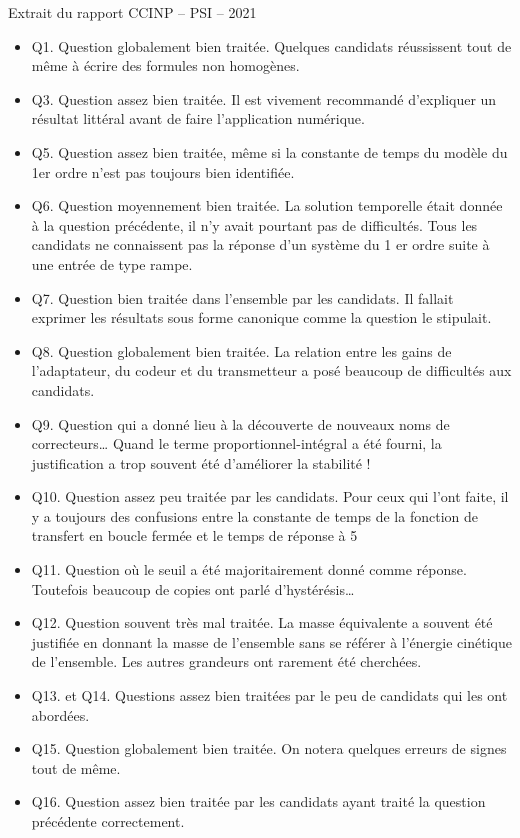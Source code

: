 \documentclass[10pt,fleqn]{article} %
\begin{document}
Extrait du rapport CCINP -- PSI -- 2021
\begin{itemize}
\item Q1. Question globalement bien traitée. Quelques candidats réussissent tout de même à écrire des formules
non homogènes.
\item Q3. Question assez bien traitée. Il est vivement recommandé d’expliquer un résultat littéral avant de faire
l’application numérique.
\item Q5. Question assez bien traitée, même si la constante de temps du modèle du 1er ordre n’est pas toujours bien
identifiée.
\item Q6. Question moyennement bien traitée. La solution temporelle était donnée à la question précédente, il n’y
avait pourtant pas de difficultés. Tous les candidats ne connaissent pas la réponse d’un système du
1
er ordre suite à une entrée de type rampe.
\item Q7. Question bien traitée dans l’ensemble par les candidats. Il fallait exprimer les résultats sous forme
canonique comme la question le stipulait.
\item Q8. Question globalement bien traitée. La relation entre les gains de l’adaptateur, du codeur et du
transmetteur a posé beaucoup de difficultés aux candidats.
\item Q9. Question qui a donné lieu à la découverte de nouveaux noms de correcteurs… Quand le terme
proportionnel-intégral a été fourni, la justification a trop souvent été d’améliorer la stabilité !
\item Q10. Question assez peu traitée par les candidats. Pour ceux qui l’ont faite, il y a toujours des confusions
entre la constante de temps de la fonction de transfert en boucle fermée et le temps de réponse à 5 %
\item Q11. Question où le seuil a été majoritairement donné comme réponse. Toutefois beaucoup de copies ont
parlé d’hystérésis…
\item Q12. Question souvent très mal traitée. La masse équivalente a souvent été justifiée en donnant la masse de
l’ensemble sans se référer à l’énergie cinétique de l’ensemble. Les autres grandeurs ont rarement été
cherchées.
\item Q13. et Q14. Questions assez bien traitées par le peu de candidats qui les ont abordées.
\item Q15. Question globalement bien traitée. On notera quelques erreurs de signes tout de même.
\item Q16. Question assez bien traitée par les candidats ayant traité la question précédente correctement.

\end{itemize}
\end{document}
